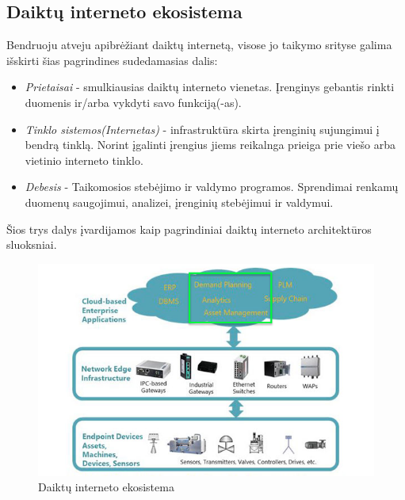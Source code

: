 \documentclass{VUMIFInfBakalaurinis}
\begin{document}
\subsection{Daiktų interneto ekosistema}

Bendruoju atveju apibrėžiant daiktų internetą, visose jo taikymo srityse galima išskirti šias pagrindines sudedamasias dalis:

\begin{itemize}
  \item \emph{Prietaisai} - smulkiausias daiktų interneto vienetas. Įrenginys gebantis rinkti duomenis ir/arba vykdyti savo funkciją(-as).
  \item \emph{Tinklo sistemos(Internetas)} - infrastruktūra skirta įrenginių sujungimui į bendrą tinklą. Norint įgalinti įrengius jiems reikalnga prieiga prie viešo arba vietinio interneto tinklo. 
  \item \emph{Debesis} - Taikomosios stebėjimo ir valdymo programos. Sprendimai renkamų duomenų saugojimui, analizei, įrenginių stebėjimui ir valdymui.
\end{itemize}

Šios trys dalys įvardijamos kaip pagrindiniai daiktų interneto architektūros sluoksniai. \cite{IOTR, IOTV}

\begin{figure}[H]
    \centering
    \includegraphics[scale=0.6]{img/iot-high-level}
    \caption{Daiktų interneto ekosistema}   %
    \label{img:mlp}
\end{figure}
\end{document}
